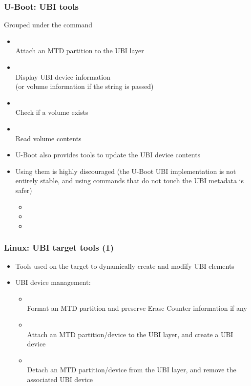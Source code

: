 \begin{frame}
  \frametitle{U-Boot: UBI tools}
  Grouped under the  command
    \begin{itemize}
    \item {}\\
	Attach an MTD partition to the UBI layer
    \item {}\\
	Display UBI device information\\
	(or volume information if the  string is passed)
    \item {}\\
	Check if a volume exists
    \item {}\\
	Read volume contents
    \item U-Boot also provides tools to update the UBI device contents
    \item Using them is highly discouraged (the U-Boot UBI implementation
      is not entirely stable, and using commands that do not touch the UBI
      metadata is safer)
      \begin{itemize}
      \item {}
      \item {}
      \item {}
      \end{itemize}
    \end{itemize}
\end{frame}

\begin{frame}
  \frametitle{Linux: UBI target tools (1)}
  \begin{itemize}
  \item Tools used on the target to dynamically create and modify
      UBI elements
  \item UBI device management:
    \begin{itemize}
    \item {}\\
	Format an MTD partition and preserve Erase Counter information if any
    \item {}\\
	Attach an MTD partition/device to the UBI layer, and create a UBI device
    \item {}\\
	Detach an MTD partition/device from the UBI layer, and remove
        the associated UBI device
    \end{itemize}
  \end{itemize}
\end{frame}

